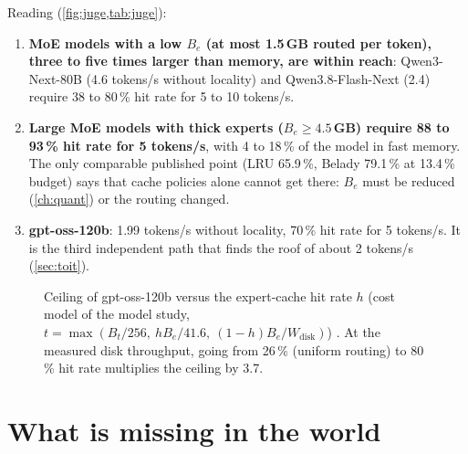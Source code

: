 Reading (\cref{fig:juge,tab:juge}):
\begin{enumerate}
\item \textbf{MoE models with a low $B_e$ (at most 1.5\,GB routed per token), three to five times larger than memory, are within reach}: Qwen3-Next-80B (4.6 tokens/s without locality) and Qwen3.8-Flash-Next (2.4) require 38 to 80\,\% hit rate for 5 to 10 tokens/s.
\item \textbf{Large MoE models with thick experts ($B_e \ge 4.5$\,GB) require 88 to 93\,\% hit rate for 5 tokens/s}, with 4 to 18\,\% of the model in fast memory. The only comparable published point (LRU 65.9\,\%, Belady 79.1\,\% at 13.4\,\% budget) says that cache policies alone cannot get there: $B_e$ must be reduced (\cref{ch:quant}) or the routing changed.
\item \textbf{gpt-oss-120b}: 1.99 tokens/s without locality, 70\,\% hit rate for 5 tokens/s. It is the third independent path that finds the roof of about 2 tokens/s (\cref{sec:toit}).
\end{enumerate}

\begin{figure}[ht]
\centering
\GrapheSensibiliteH
\caption[The ceiling of gpt-oss-120b versus cache hit rate]{Ceiling of gpt-oss-120b versus the expert-cache hit rate $h$ (cost model of the model study, $t = \max(B_t/256,\ hB_e/41.6,\ (1-h)B_e/W_{\mathrm{disk}})$) \calc. At the measured disk throughput, going from 26\,\% (uniform routing) to 80\,\% hit rate multiplies the ceiling by 3.7.}
\label{fig:sensibilite-h}
\end{figure}

\section{What is missing in the world}\label{sec:trous-chargement}

